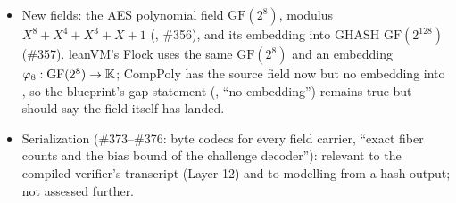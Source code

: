 \begin{itemize}
  ), so  gets ,  and ring operations at
  the new pin; the blueprint's \enquote{no  at the pin}
  () is stale after \#61 (not re-checked by instance search: no
  run).
\item New fields: the AES polynomial field $\mathrm{GF}(2^8)$, modulus $X^8 + X^4 + X^3 + X + 1$
  (\allowbreak{}\allowbreak{}\allowbreak{}\allowbreak{}, \#356), and its embedding into GHASH
  $\mathrm{GF}(2^{128})$ (\#357). leanVM's Flock uses the same $\mathrm{GF}(2^8)$ and an embedding
  $\varphi_8 : \mathrm{GF}(2^8) \to \mathbb{K}$; CompPoly has the source field now but no embedding into
  , so the blueprint's gap statement (, \enquote{no
   embedding}) remains true but should say the field itself has landed.
\item Serialization (\#373--\#376: byte codecs for every field carrier, \enquote{exact fiber
  counts and the bias bound of the challenge decoder}): relevant to the compiled verifier's
  transcript (Layer 12) and to modelling  from a hash output; not assessed
  further.
\end{itemize}

